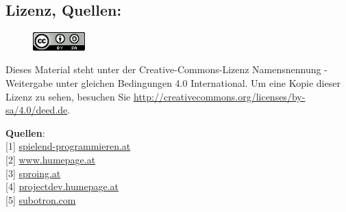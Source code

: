 \subsection*{Lizenz, Quellen:}
\begin{figure}
\includegraphics[width=2cm]{spieletester/ccbysa88x31.png}
\end{figure}
Dieses Material steht unter der Creative-Commons-Lizenz Namensnennung - Weitergabe unter gleichen Bedingungen 4.0 International. Um eine Kopie dieser Lizenz zu sehen, besuchen Sie \url{http://creativecommons.org/licenses/by-sa/4.0/deed.de}.


\textbf{Quellen}: \\
{[}1{]} \href{http://spielend-programmieren.at}{spielend-programmieren.at} \\
{[}2{]} \href{http://www.humepage.at}{www.humepage.at} \\
{[}3{]} \href{https://www.sproing.at/}{sproing.at} \\
{[}4{]} \href{http://projectdev.humepage.at/}{projectdev.humepage.at} \\
{[}5{]} \href{http://subotron.com/}{subotron.com} \\








